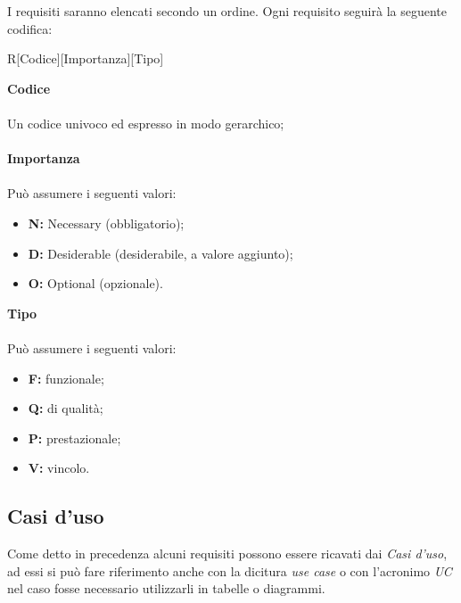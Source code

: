\documentclass[a4paper]{report}
\begin{document}
	I requisiti saranno elencati secondo un ordine. Ogni requisito seguirà la seguente codifica: \\
	\begin{center}
		R[Codice][Importanza][Tipo]
	\end{center}
	\textbf{Codice} \\ \\ Un codice univoco ed espresso in modo gerarchico;\\ \\
	\textbf{Importanza} \\ \\Può assumere i seguenti valori:
	\begin{itemize}
		\item \textbf{N:} Necessary (obbligatorio);
		\item \textbf{D:} Desiderable (desiderabile, a valore aggiunto);
		\item \textbf{O:} Optional (opzionale).
	\end{itemize}
	\textbf{Tipo} \\ \\Può assumere i seguenti valori:
	\begin{itemize}
		\item \textbf{F:} funzionale;
		\item \textbf{Q:} di qualità;
		\item \textbf{P:} prestazionale;
		\item \textbf{V:} vincolo.
	\end{itemize}
	\subsection{Casi d'uso}
		Come detto in precedenza alcuni requisiti possono essere ricavati dai \emph{Casi d'uso}, ad essi si può fare
		 riferimento anche con la dicitura \emph{use case} o con l'acronimo \emph{UC} nel caso fosse necessario  
		 utilizzarli in tabelle o diagrammi. 
		 
\end{document}
